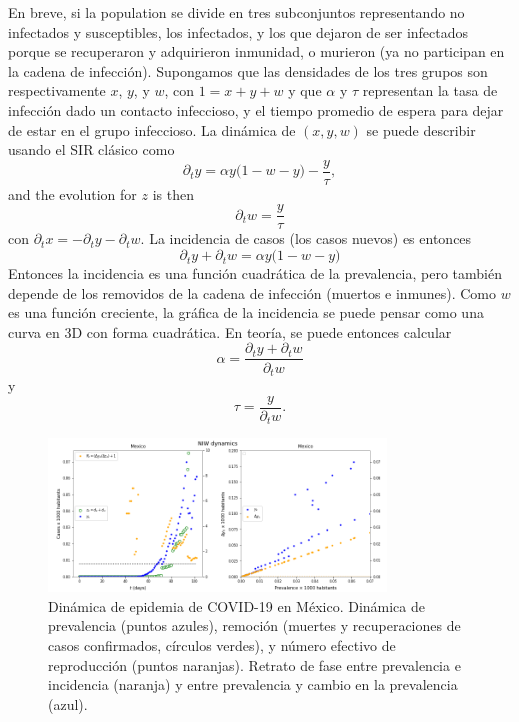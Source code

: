 \documentclass[8pt]{article}
\begin{document}
En breve, si la population se divide en tres subconjuntos representando no infectados y susceptibles, los infectados, y los que dejaron de ser infectados porque se recuperaron y adquirieron inmunidad, o murieron (ya no participan en la cadena de infección). Supongamos que las densidades de los tres grupos son respectivamente $x$, $y$, y $w$, con $1=x+y+w$ y que  $\alpha$ y $\tau$ representan la tasa de infección dado un contacto infeccioso, y el tiempo promedio de espera para dejar de estar en el grupo infeccioso. La dinámica de $(x,y,w)$ se puede describir usando el SIR clásico como  
\begin{equation}
\partial_t y = \alpha y \bigg( 1- w - y \bigg) - \frac{y}{\tau},
\end{equation}
and the evolution for $z$ is then
\begin{equation}
\partial_t w = \frac{y}{\tau}
\end{equation}
con $\partial_t x =-\partial_t y - \partial_t w $. 
La incidencia de casos (los casos nuevos) es entonces 
\begin{equation}
\partial_{t} y + \partial_{t} w =\alpha y \bigg( 1- w - y \bigg)
\end{equation}
Entonces la incidencia es una función cuadrática de la prevalencia, pero también depende de los removidos de la cadena de infección (muertos e inmunes). Como $w$ es una función creciente, la gráfica de la incidencia se puede pensar como una curva en 3D con forma cuadrática.
En teoría, se puede entonces calcular 
\begin{equation}
\alpha = \frac{\partial_{t} y + \partial_{t} w}{\partial_{t} w} 
\end{equation}
y 
\begin{equation}
\tau = \frac{y}{\partial_{t} w}. 
\end{equation}



\begin{figure}[h] \caption{Dinámica de epidemia de COVID-19 en México. Dinámica de prevalencia (puntos azules), remoción (muertes y recuperaciones de casos confirmados, círculos verdes), y número efectivo de reproducción (puntos naranjas).  Retrato de fase entre prevalencia e incidencia (naranja) y entre prevalencia y cambio en la prevalencia (azul).}\label{fig:dataPPNIW_Mexico}
\centering
\includegraphics[width=0.8\textwidth]{figures/dam_COVID19_JHU_dynamicsDataSIRPP_Mexico}
\end{figure}
\end{document}
